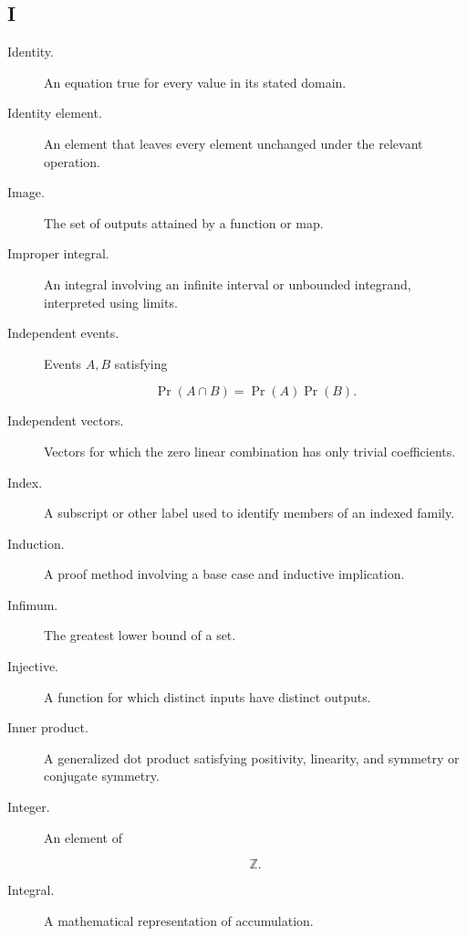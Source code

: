 \subsection*{I}

\begin{description}

\item[Identity.]
An equation true for every value in its stated domain.

\item[Identity element.]
An element that leaves every element unchanged under the relevant operation.

\item[Image.]
The set of outputs attained by a function or map.

\item[Improper integral.]
An integral involving an infinite interval or unbounded integrand, interpreted
using limits.

\item[Independent events.]
Events \(A,B\) satisfying

\[
\Pr(A\cap B)
=
\Pr(A)\Pr(B).
\]

\item[Independent vectors.]
Vectors for which the zero linear combination has only trivial coefficients.

\item[Index.]
A subscript or other label used to identify members of an indexed family.

\item[Induction.]
A proof method involving a base case and inductive implication.

\item[Infimum.]
The greatest lower bound of a set.

\item[Injective.]
A function for which distinct inputs have distinct outputs.

\item[Inner product.]
A generalized dot product satisfying positivity, linearity, and symmetry or
conjugate symmetry.

\item[Integer.]
An element of

\[
\mathbb{Z}.
\]

\item[Integral.]
A mathematical representation of accumulation.


\end{description}
